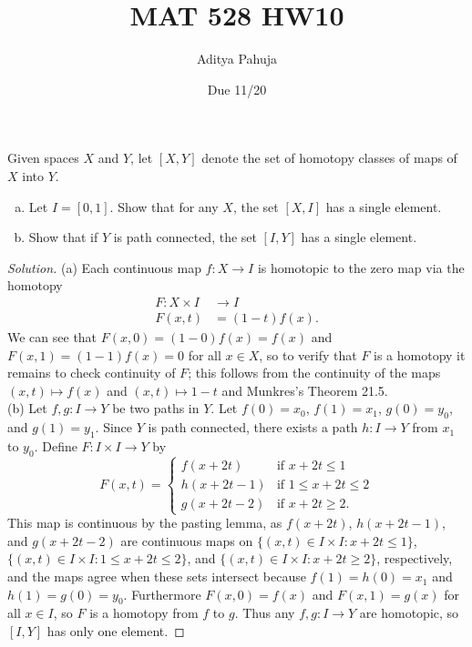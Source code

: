 \documentclass[10pt]{article}
\title{MAT 528 HW10}
\author{\large Aditya Pahuja}
\date{\large Due 11/20}
\providecommand{\ii}{\item}
\newenvironment{soln}{\begin{proof}[Solution]}{\end{proof}}
\begin{document}
\maketitle

\begin{problem}
    [Munkres 51.2]
    Given spaces $X$ and $Y$, let $[X,Y]$ denote the set of
    homotopy classes of maps of $X$ into $Y$.
    \begin{enumerate}[(a)]
	\ii Let $I = [0,1]$. Show that for any $X$,
	the set $[X,I]$ has a single element.
	\ii Show that if $Y$ is path connected,
	the set $[I,Y]$ has a single element.
    \end{enumerate}
\end{problem}

\begin{soln}
    (a) Each continuous map $f\colon X\to I$ is homotopic to the zero map
    via the homotopy
    \begin{align*}
	F\colon X\times I&\to I\\
	F(x,t) &= (1-t)f(x).
    \end{align*}
    We can see that $F(x,0) = (1-0)f(x) = f(x)$ and $F(x,1) = (1-1)f(x) = 0$
    for all $x\in X$, so to verify that $F$ is a homotopy
    it remains to check continuity of $F$;
    this follows from the continuity of the maps
    $(x,t)\mapsto f(x)$ and $(x,t)\mapsto 1-t$
    and Munkres's Theorem 21.5.
    \\

    (b) Let $f,g\colon I\to Y$ be two paths in $Y$.
    Let $f(0) = x_0$, $f(1) = x_1$, $g(0) = y_0$, and $g(1) = y_1$.
    Since $Y$ is path connected, there exists a path
    $h\colon I\to Y$ from $x_1$ to $y_0$.
    Define $F\colon I\times I\to Y$ by
    \begin{equation*}
        F(x,t) = \begin{cases}
	    f(x + 2t) & \text{if }x+2t \le 1\\
	    h(x + 2t - 1) & \text{if }1\le x+2t \le 2\\
	    g(x + 2t - 2) & \text{if }x+2t \ge 2.
        \end{cases}
    \end{equation*}
    This map is continuous by the pasting lemma,
    as $f(x+2t)$, $h(x+2t-1)$, and $g(x+2t-2)$
    are continuous maps on
    $\{(x,t)\in I\times I : x+2t\le 1\}$,
    $\{(x,t)\in I\times I : 1\le x+2t\le 2\}$,
    and $\{(x,t)\in I\times I : x+2t\ge 2\}$, respectively,
    and the maps agree when these sets intersect because
    $f(1) = h(0) = x_1$ and $h(1) = g(0) = y_0$.
    Furthermore $F(x,0) = f(x)$ and $F(x,1) = g(x)$ for all $x\in I$,
    so $F$ is a homotopy from $f$ to $g$.
    Thus any $f,g\colon I\to Y$ are homotopic,
    so $[I,Y]$ has only one element.
\end{soln}
\end{document}
